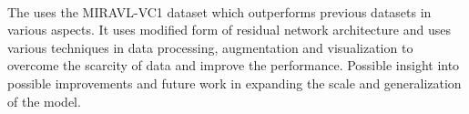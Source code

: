 \\The \cite{gutierrez2017lip} uses the  MIRAVL-VC1 dataset which outperforms previous datasets in various aspects. It uses modified form of residual network architecture and uses various techniques in data processing, augmentation and visualization to overcome the scarcity of data and improve the performance. Possible insight into possible improvements and future work in expanding the scale and generalization of the model.
